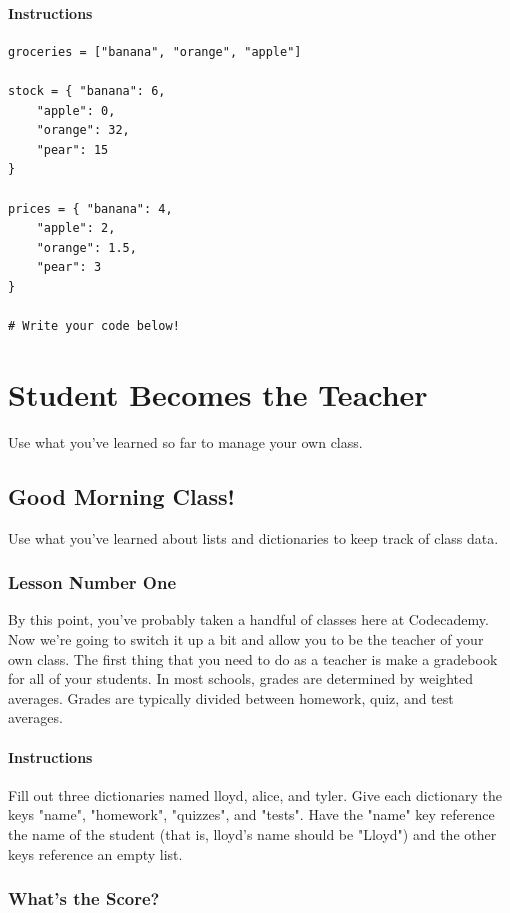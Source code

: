 \documentclass[12pt,a4paper,final,twoside,onecolumn,titlepage]{book}
\begin{document}
\subsubsection{Instructions}
\begin{lstlisting}
groceries = ["banana", "orange", "apple"]

stock = { "banana": 6,
    "apple": 0,
    "orange": 32,
    "pear": 15
}
    
prices = { "banana": 4,
    "apple": 2,
    "orange": 1.5,
    "pear": 3
}

# Write your code below!
\end{lstlisting}

\chapter{Student Becomes the Teacher}
Use what you've learned so far to manage your own class.
\section{Good Morning Class!}
Use what you've learned about lists and dictionaries to keep track of class data.
\subsection{Lesson Number One}

By this point, you’ve probably taken a handful of classes here at Codecademy. Now we’re going to switch it up a bit and allow you to be the teacher of your own class. The first thing that you need to do as a teacher is make a gradebook for all of your students. In most schools, grades are determined by weighted averages. Grades are typically divided between homework, quiz, and test averages.
\subsubsection{Instructions}

Fill out three dictionaries named lloyd, alice, and tyler. Give each dictionary the keys "name", "homework", "quizzes", and "tests". Have the "name" key reference the name of the student (that is, lloyd's name should be "Lloyd") and the other keys reference an empty list.

\subsection{What's the Score?}
\end{document}
